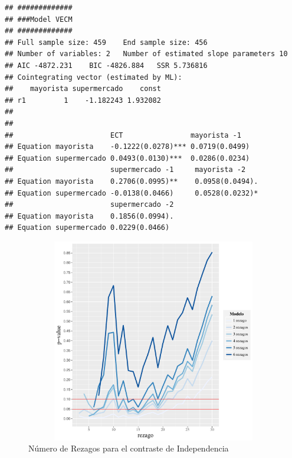\documentclass[12pt, twoside]{book}\usepackage[]{graphicx}\usepackage[]{color}
\makeatletter
\newenvironment{kframe}{%
 \def\at@end@of@kframe{}%
 \ifinner\ifhmode%
  \def\at@end@of@kframe{\end{minipage}}%
  \begin{minipage}{\columnwidth}%
 \fi\fi%
 \def\FrameCommand##1{\hskip\@totalleftmargin \hskip-\fboxsep
 \colorbox{shadecolor}{##1}\hskip-\fboxsep
     \hskip-\linewidth \hskip-\@totalleftmargin \hskip\columnwidth}%
 \MakeFramed {\advance\hsize-\width
   \@totalleftmargin\z@ \linewidth\hsize
   \@setminipage}}%
 {\par\unskip\endMakeFramed%
 \at@end@of@kframe}
\newenvironment{knitrout}{}{} %
\numberwithin{equation}{section}
\numberwithin{theorem}{section}
\numberwithin{teorema}{section}
\numberwithin{defi}{section}
\numberwithin{prop}{section}
\numberwithin{defi}{section}
\theoremstyle{plain}
\makeatother
\begin{document}
\begin{knitrout}
\color{fgcolor}\begin{kframe}
\begin{verbatim}
## #############
## ###Model VECM 
## #############
## Full sample size: 459 	End sample size: 456
## Number of variables: 2 	Number of estimated slope parameters 10
## AIC -4872.231 	BIC -4826.884 	SSR 5.736816
## Cointegrating vector (estimated by ML):
##    mayorista supermercado    const
## r1         1    -1.182243 1.932082
## 
## 
##                       ECT                mayorista -1      
## Equation mayorista    -0.1222(0.0278)*** 0.0719(0.0499)    
## Equation supermercado 0.0493(0.0130)***  0.0286(0.0234)    
##                       supermercado -1     mayorista -2     
## Equation mayorista    0.2706(0.0995)**    0.0958(0.0494).  
## Equation supermercado -0.0138(0.0466)     0.0528(0.0232)*  
##                       supermercado -2   
## Equation mayorista    0.1856(0.0994).   
## Equation supermercado 0.0229(0.0466)
\end{verbatim}
\end{kframe}\begin{figure}[H]

{\centering \includegraphics[width=5in,height=3.5in]{figure/unnamed-chunk-12-1} 

}

\caption[Número de Rezagos para el contraste de Independencia]{Número de Rezagos para el contraste de Independencia}\label{fig:unnamed-chunk-12}
\end{figure}


\end{knitrout}
\end{document}
